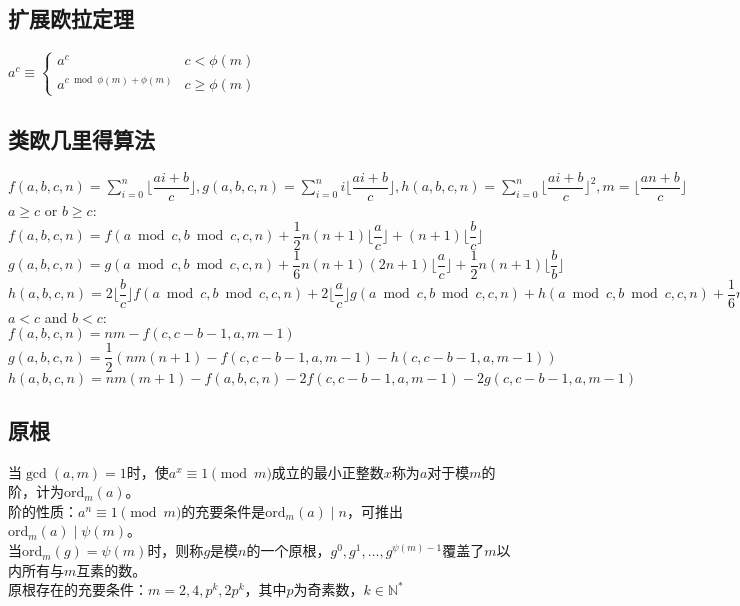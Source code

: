 \newcommand{\eularian}{\genfrac\langle\rangle{0pt}{2}}
\newcommand{\Eularian}{\genfrac{\langle\!\langle}{\rangle\!\rangle}{0pt}{2}}

\subsection*{扩展欧拉定理}
    $ a^c \equiv \begin{cases} a^c & c < \phi(m) \\ a^{c \bmod \phi(m) + \phi(m)} & c \ge \phi(m) \end{cases} $

\subsection*{类欧几里得算法}
    $ f(a, b, c, n) = \sum\limits_{i=0}^n \lfloor \dfrac{ai + b}{c} \rfloor, g(a, b, c, n) = \sum\limits_{i=0}^n i \lfloor \dfrac{ai + b}{c} \rfloor, h(a, b, c, n) = \sum\limits_{i=0}^n \lfloor \dfrac{ai + b}{c} \rfloor ^2, m = \lfloor \dfrac{an + b}{c} \rfloor $
    \\$a \ge c$ or $b \ge c$:
    \\$f(a, b, c, n) = f(a \bmod c, b \bmod c, c, n) + \dfrac{1}{2} n (n + 1) \lfloor \dfrac{a}{c} \rfloor + (n + 1) \lfloor \dfrac{b}{c} \rfloor $
    \\$g(a, b, c, n) = g(a \bmod c, b \bmod c, c, n) + \dfrac{1}{6} n (n + 1) (2n + 1) \lfloor \dfrac{a}{c} \rfloor + \dfrac{1}{2} n (n + 1) \lfloor \dfrac{b}{b} \rfloor $
    \\$h(a, b, c, n) = 2 \lfloor \dfrac{b}{c} \rfloor f(a \bmod c, b \bmod c, c, n) + 2 \lfloor \dfrac{a}{c} \rfloor g(a \bmod c, b \bmod c, c, n) + h(a \bmod c, b \bmod c, c, n) + \dfrac{1}{6} n (n + 1) (2n + 1) \lfloor \dfrac{a}{c} \rfloor^2 + (n + 1) \lfloor \dfrac{b}{c} \rfloor^2 + n (n + 1) \lfloor \dfrac{a}{c} \rfloor \lfloor \dfrac{b}{c} \rfloor $
    \\$ a < c $ and $ b < c $:
    \\$ f(a, b, c, n) = nm - f(c, c - b - 1, a, m - 1) $
    \\$ g(a, b, c, n) = \dfrac{1}{2} (nm(n + 1) - f(c, c - b - 1, a, m - 1) - h(c, c - b - 1, a, m - 1)) $
    \\$ h(a, b, c, n) = nm(m + 1) - f(a, b, c, n) - 2f(c, c - b - 1, a, m - 1) - 2g(c, c - b - 1, a, m - 1) $

\subsection*{原根}
    当$ \gcd(a, m) = 1 $时，使$ a^x \equiv 1 \pmod m $成立的最小正整数$ x $称为$ a $对于模$ m $的阶，计为$ \text{ord}_m(a) $。
    \\阶的性质：$ a^n \equiv 1 \pmod m $的充要条件是$ \text{ord}_m(a) \mid n $，可推出$ \text{ord}_m(a) \mid \psi(m) $。
    \\当$ \text{ord}_m(g) = \psi(m) $时，则称$ g $是模$ n $的一个原根，$ g^0, g^1, \dots, g^{\psi(m) - 1} $覆盖了$ m $以内所有与$ m $互素的数。
    \\原根存在的充要条件：$ m = 2, 4, p^k, 2 p^k $，其中$ p $为奇素数，$ k \in \mathbb{N}^\ast $

